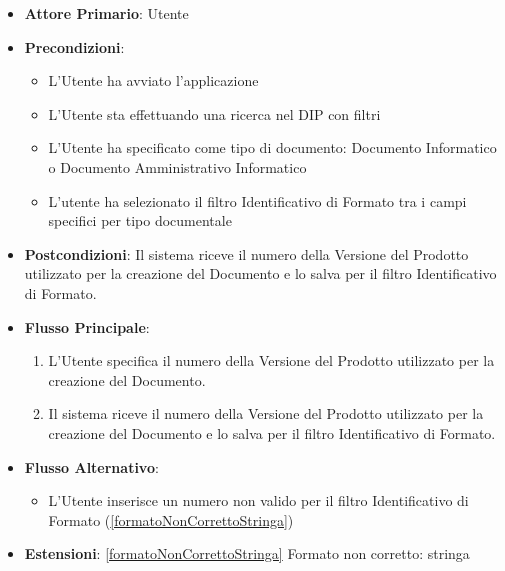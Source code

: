 \begin{itemize}
      \item \textbf{Attore Primario}: Utente
      \item \textbf{Precondizioni}: 
      \begin{itemize}
            \item L'Utente ha avviato l'applicazione
            \item L'Utente sta effettuando una ricerca nel DIP con filtri
            \item L'Utente ha specificato come tipo di documento: Documento Informatico o Documento Amministrativo Informatico
            \item L'utente ha selezionato il filtro Identificativo di Formato tra i campi specifici per tipo documentale
      \end{itemize}
      \item \textbf{Postcondizioni}: Il sistema riceve il numero della Versione del Prodotto utilizzato per la creazione del Documento e lo salva per il filtro Identificativo di Formato.
      \item \textbf{Flusso Principale}:
      \begin{enumerate}
            \item L'Utente specifica il numero della Versione del Prodotto utilizzato per la creazione del Documento.
            \item Il sistema riceve il numero della Versione del Prodotto utilizzato per la creazione del Documento e lo salva per il filtro Identificativo di Formato.
      \end{enumerate}
      \item \textbf{Flusso Alternativo}:
      \begin{itemize}
            \item L'Utente inserisce un numero non valido per il filtro Identificativo di Formato (\ref{formatoNonCorrettoStringa})
      \end{itemize}
      \item \textbf{Estensioni}: \ref{formatoNonCorrettoStringa} Formato non corretto: stringa
\end{itemize}

